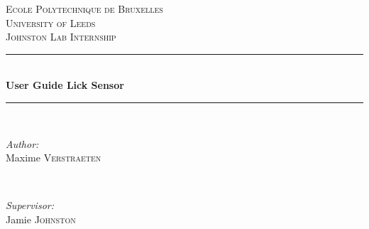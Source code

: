 \documentclass[a4paper]{article}
\begin{document}
\begin{titlepage}

\newcommand{\HRule}{\rule{\linewidth}{0.5mm}} %

\center %
 

\textsc{\LARGE Ecole Polytechnique de Bruxelles}\\[1.5cm] %
\textsc{\LARGE University of Leeds}\\[1.5cm]
\textsc{\large Johnston Lab Internship}\\[0.5cm] %


\HRule \\[0.4cm]
{ \huge \bfseries User Guide Lick Sensor}\\[0.4cm] %
\HRule \\[1.5cm]
 

\begin{minipage}{0.4\textwidth}
\begin{flushleft} \large
\emph{Author:}\\
Maxime \textsc{Verstraeten} %
\end{flushleft}
\end{minipage}
~
\begin{minipage}{0.4\textwidth}
\begin{flushright} \large
\emph{Supervisor:} \\
Jamie \textsc{Johnston}\\[0.3cm] %
\end{flushright}
\end{minipage}\\[2cm]



\end{titlepage}
\end{document}
